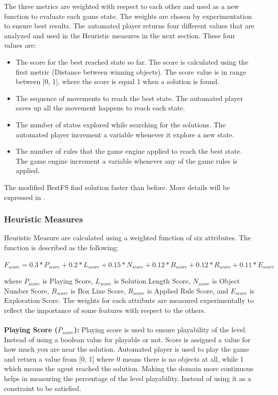The three metrics are weighted with respect to each other and used as a new function to evaluate each game state. The weights are chosen by experimentation to ensure best results. The automated player returns four different values that are analyzed and used in the Heuristic measures in the next section. These four values are:
\begin{itemize} \itemsep0pt \parskip0pt 
	\item The score for the best reached state so far. The score is calculated using the first metric (Distance between winning objects). The score value is in range between [0, 1], where the score is equal 1 when a solution is found.
	\item The sequence of movements to reach the best state. The automated player saves up all the movement happens to reach each state.
	\item The number of states explored while searching for the solutions. The automated player increment a variable whenever it explore a new state.
	\item The number of rules that the game engine applied to reach the best state. The game engine increment a variable whenever any of the game rules is applied.
\end{itemize}
The modified BestFS find solution faster than before. More details will be expressed in .\\\par

\subsubsection{Heuristic Measures}
Heuristic Measure are calculated using a weighted function of six attributes. The function is described as the following:
\begin{center}$F_{score} = 0.3 * P_{score} + 0.2 * L_{score} + 0.15 * N_{score} + 0.12 * B_{score} + 0.12 * R_{score} + 0.11 * E_{score}$\end{center}
where $P_{score}$ is Playing Score, $L_{score}$ is Solution Length Score, $N_{score}$ is Object Number Score, $B_{score}$ is Box Line Score, $R_{score}$ is Applied Rule Score, and $E_{score}$ is Exploration Score. The weights for each attribute are measured experimentally to reflect the importance of some features with respect to the others.\\\\
\textbf{Playing Score ($P_{score}$):} Playing score is used to ensure playability of the level. Instead of using a boolean value for playable or not. Score is assigned a value for how much you are near the solution. Automated player is used to play the game and return a value from [0, 1] where 0 means there is no objects at all, while 1 which means the agent reached the solution. Making the domain more continuous helps in measuring the percentage of the level playability. Instead of using it as a constraint to be satisfied.\\\par

